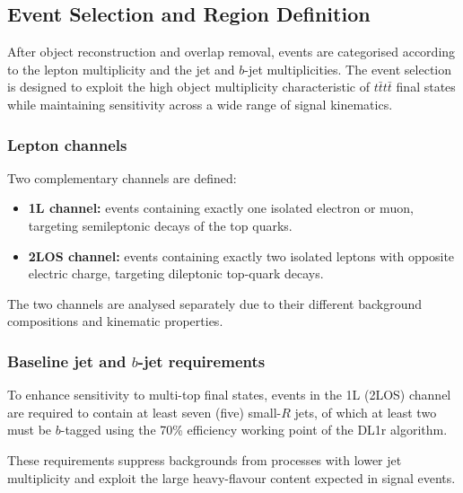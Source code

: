 \subsection{Event Selection and Region Definition}
\label{sec:event_selection}

After object reconstruction and overlap removal,
events are categorised according to the lepton multiplicity
and the jet and $b$-jet multiplicities.
The event selection is designed to exploit the high object
multiplicity characteristic of $t\bar{t}t\bar{t}$ final states
while maintaining sensitivity across a wide range of signal
kinematics.

\subsubsection{Lepton channels}

Two complementary channels are defined:

\begin{itemize}
\item \textbf{1L channel:} events containing exactly one isolated
electron or muon, targeting semileptonic decays of the top quarks.

\item \textbf{2LOS channel:} events containing exactly two isolated
leptons with opposite electric charge, targeting dileptonic top-quark
decays.
\end{itemize}

The two channels are analysed separately due to their different
background compositions and kinematic properties.

\subsubsection{Baseline jet and $b$-jet requirements}

To enhance sensitivity to multi-top final states,
events in the 1L (2LOS) channel are required to contain
at least seven (five) small-$R$ jets,
of which at least two must be $b$-tagged using
the 70\% efficiency working point of the DL1r algorithm.

These requirements suppress backgrounds from processes
with lower jet multiplicity and exploit the large
heavy-flavour content expected in signal events.

